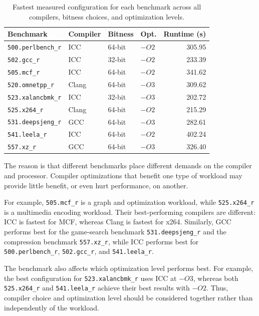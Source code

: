 \documentclass[11pt,a4paper]{article}
\newcommand{\bench}[1]{\texttt{#1}}
\begin{document}
\begin{table}[H]
\centering
\caption{Fastest measured configuration for each benchmark across all compilers, bitness choices, and optimization levels.}
\label{tab:best}
\small
\begin{tabular}{llllr}
\toprule
Benchmark & Compiler & Bitness & Opt. & Runtime (s) \\
\midrule
\bench{500.perlbench\_r} & ICC & 64-bit & $-O2$ & 305.95 \\
\bench{502.gcc\_r} & ICC & 32-bit & $-O2$ & 233.39 \\
\bench{505.mcf\_r} & ICC & 64-bit & $-O2$ & 341.62 \\
\bench{520.omnetpp\_r} & Clang & 64-bit & $-O3$ & 309.62 \\
\bench{523.xalancbmk\_r} & ICC & 32-bit & $-O3$ & 202.72 \\
\bench{525.x264\_r} & Clang & 64-bit & $-O2$ & 215.29 \\
\bench{531.deepsjeng\_r} & GCC & 64-bit & $-O3$ & 282.61 \\
\bench{541.leela\_r} & ICC & 64-bit & $-O2$ & 402.24 \\
\bench{557.xz\_r} & GCC & 64-bit & $-O3$ & 326.40 \\
\bottomrule
\end{tabular}
\end{table}

The reason is that different benchmarks place different demands on the
compiler and processor. Compiler optimizations that benefit one type of
workload may provide little benefit, or even hurt performance, on another.

For example, \bench{505.mcf\_r} is a graph and optimization workload, while
\bench{525.x264\_r} is a multimedia encoding workload. Their best-performing
compilers are different: ICC is fastest for MCF, whereas Clang is fastest for
x264. Similarly, GCC performs best for the game-search benchmark
\bench{531.deepsjeng\_r} and the compression benchmark \bench{557.xz\_r},
while ICC performs best for \bench{500.perlbench\_r},
\bench{502.gcc\_r}, and \bench{541.leela\_r}.

The benchmark also affects which optimization level performs best. For
example, the best configuration for \bench{523.xalancbmk\_r} uses ICC at
$-O3$, whereas both \bench{525.x264\_r} and \bench{541.leela\_r} achieve
their best results with $-O2$. Thus, compiler choice and optimization level
should be considered together rather than independently of the workload.
\end{document}
